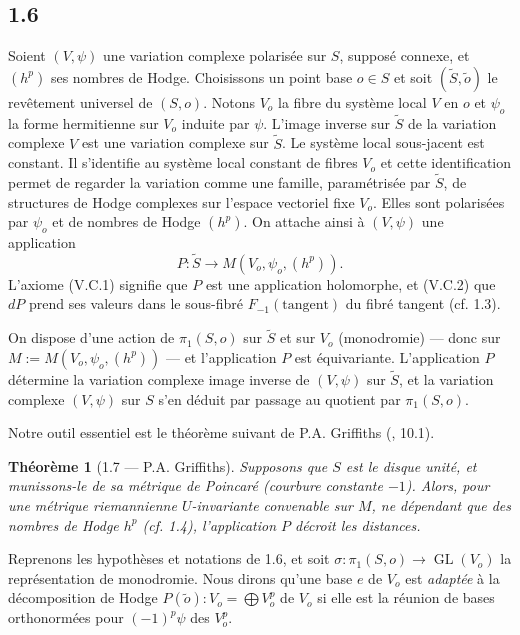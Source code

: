 \documentclass[12pt,a4paper]{article}
\theoremstyle{plain}
\newtheorem{theorem}{Th\'{e}or\`{e}me}[section]
\theoremstyle{definition}
\DeclareMathOperator{\GL}{GL}
\begin{document}
\subsection*{1.6}
Soient $(V, \psi)$ une variation complexe polaris\'{e}e sur $S$, suppos\'{e} connexe, et $(h^{p})$ ses nombres de Hodge. Choisissons un point base $o \in S$ et soit $(\widetilde{S}, \tilde{o})$ le rev\^{e}tement universel de $(S,o)$. Notons $V_{o}$ la fibre du syst\`{e}me local $V$ en $o$ et $\psi_{o}$ la forme hermitienne sur $V_{o}$ induite par $\psi$. L'image inverse sur $\widetilde{S}$ de la variation complexe $V$ est une variation complexe sur $\widetilde{S}$. Le syst\`{e}me local sous-jacent est constant. Il s'identifie au syst\`{e}me local constant de fibres $V_{o}$ et cette identification permet de regarder la variation comme une famille, param\'{e}tris\'{e}e par $\widetilde{S}$, de structures de Hodge complexes sur l'espace vectoriel fixe $V_{o}$. Elles sont polaris\'{e}es par $\psi_{o}$ et de nombres de Hodge $(h^{p})$. On attache ainsi \`{a} $(V, \psi)$ une application
\[
P : \widetilde{S} \to M(V_{o}, \psi_{o}, (h^{p})).
\]
L'axiome (V.C.1) signifie que $P$ est une application holomorphe, et (V.C.2) que $dP$ prend ses valeurs dans le sous-fibr\'{e} $F_{-1}(\text{tangent})$ du fibr\'{e} tangent (cf. 1.3).

On dispose d'une action de $\pi_{1}(S,o)$ sur $\widetilde{S}$ et sur $V_{o}$ (monodromie) --- donc sur $M := M(V_{o}, \psi_{o}, (h^{p}))$ --- et l'application $P$ est \'{e}quivariante. L'application $P$ d\'{e}termine la variation complexe image inverse de $(V, \psi)$ sur $\widetilde{S}$, et la variation complexe $(V, \psi)$ sur $S$ s'en d\'{e}duit par passage au quotient par $\pi_{1}(S,o)$.

Notre outil essentiel est le th\'{e}or\`{e}me suivant de P.A. Griffiths (\cite{GriffithsBull}, 10.1).

\begin{theorem}[1.7 --- P.A. Griffiths]
Supposons que $S$ est le disque unit\'{e}, et munissons-le de sa m\'{e}trique de Poincar\'{e} (courbure constante $-1$). Alors, pour une m\'{e}trique riemannienne $U$-invariante convenable sur $M$, ne d\'{e}pendant que des nombres de Hodge $h^{p}$ (cf. 1.4), l'application $P$ d\'{e}croit les distances.
\end{theorem}

Reprenons les hypoth\`{e}ses et notations de 1.6, et soit $\sigma : \pi_{1}(S,o) \to \GL(V_{o})$ la repr\'{e}sentation de monodromie. Nous dirons qu'une base $e$ de $V_{o}$ est \emph{adapt\'{e}e} \`{a} la d\'{e}composition de Hodge $P(\tilde{o}) : V_{o} = \bigoplus V_{o}^{p}$ de $V_{o}$ si elle est la r\'{e}union de bases orthonorm\'{e}es pour $(-1)^{p}\psi$ des $V_{o}^{p}$.
\end{document}
